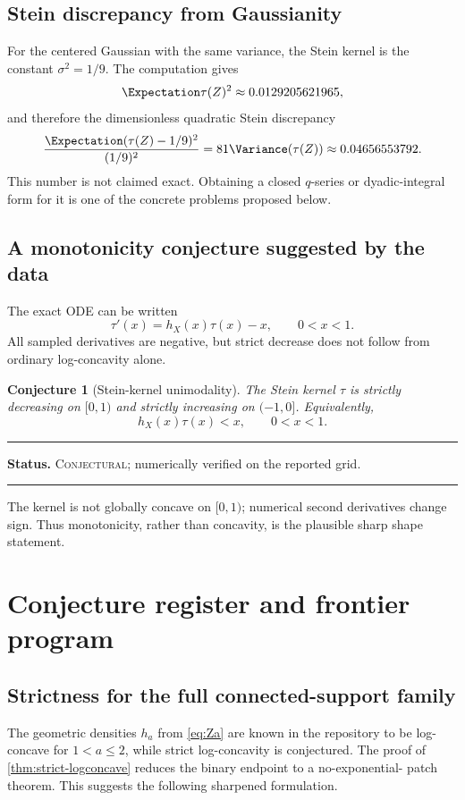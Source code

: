 \documentclass[11pt,oneside]{article}
\newtheorem{conjecture}[theorem]{Conjecture}
\theoremstyle{definition}
\theoremstyle{remark}
\newenvironment{boxedremark}{%
  \par\smallskip\noindent\begin{center}\begin{minipage}{0.94\textwidth}%
  \color{black}\hrule\vspace{0.6em}\small
}{%
  \vspace{0.6em}\hrule\end{minipage}\end{center}\smallskip
}
\newcommand{\Conjectural}{\textsc{Conjectural}}
\newcommand{\Status}[1]{%
  \begin{boxedremark}\textbf{Status.} #1.\end{boxedremark}}
\begin{document}
\subsection{Stein discrepancy from Gaussianity}
For the centered Gaussian with the same variance, the Stein kernel is the constant
$\sigma^2=1/9$.  The computation gives
\begin{equation}\label{eq:stein-discrepancy-numeric}
 \Expectation\tau(Z)^2\approx0.0129205621965,
\end{equation}
and therefore the dimensionless quadratic Stein discrepancy
\begin{equation}\label{eq:normalized-stein-discrepancy}
 \frac{\Expectation(\tau(Z)-1/9)^2}{(1/9)^2}
 =81\Variance(\tau(Z))
 \approx0.04656553792.
\end{equation}
This number is not claimed exact.  Obtaining a closed $q$-series or dyadic-integral
form for it is one of the concrete problems proposed below.

\subsection{A monotonicity conjecture suggested by the data}
The exact ODE can be written
\begin{equation}\label{eq:tau-hazard-ode}
 \tau'(x)=h_X(x)\tau(x)-x,
 \qquad 0<x<1.
\end{equation}
All sampled derivatives are negative, but strict decrease does not follow from
ordinary log-concavity alone.

\begin{conjecture}[Stein-kernel unimodality]\label{conj:tau-monotone}
The Stein kernel $\tau$ is strictly decreasing on $[0,1)$ and strictly increasing
on $(-1,0]$.  Equivalently,
\begin{equation}
 h_X(x)\tau(x)<x,
 \qquad 0<x<1.
\end{equation}
\end{conjecture}
\Status{\Conjectural; numerically verified on the reported grid}

The kernel is not globally concave on $[0,1)$; numerical second derivatives change
sign.  Thus monotonicity, rather than concavity, is the plausible sharp shape
statement.

\section{Conjecture register and frontier program}

\subsection{Strictness for the full connected-support family}
The geometric densities $h_a$ from \eqref{eq:Za} are known in the repository to
be log-concave for $1<a\le2$, while strict log-concavity is conjectured.  The proof
of \cref{thm:strict-logconcave} reduces the binary endpoint to a no-exponential-
patch theorem.  This suggests the following sharpened formulation.
\end{document}
